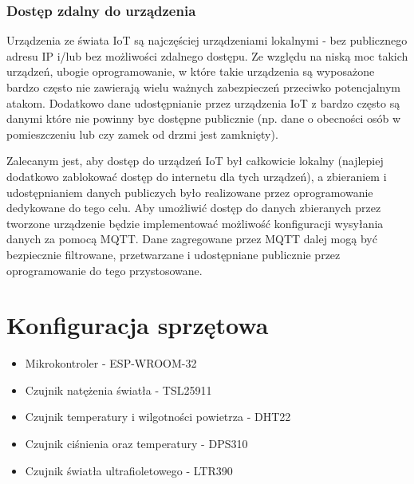 \documentclass[12pt,a4paper]{article}
\begin{document}
\subsubsection{Dostęp zdalny do urządzenia}

Urządzenia ze świata IoT są najczęściej urządzeniami lokalnymi - bez publicznego adresu IP i/lub bez możliwości zdalnego dostępu.
Ze względu na niską moc takich urządzeń, ubogie oprogramowanie, w które takie urządzenia są wyposażone bardzo często nie zawierają
wielu ważnych zabezpieczeń przeciwko potencjalnym atakom. Dodatkowo dane udostępnianie przez urządzenia IoT z bardzo często są danymi które nie powinny byc dostępne publicznie
(np. dane o obecności osób w pomieszczeniu lub czy zamek od drzmi jest zamknięty). 

Zalecanym jest, aby dostęp do urządzeń IoT był całkowicie lokalny (najlepiej dodatkowo zablokować dostęp do internetu dla tych urządzeń),
a zbieraniem i udostępnianiem danych publiczych było realizowane przez oprogramowanie dedykowane do tego celu.
Aby umożliwić dostęp do danych zbieranych przez tworzone urządzenie będzie implementować możliwość konfiguracji wysyłania danych za pomocą MQTT.
Dane zagregowane przez MQTT dalej mogą być bezpiecznie filtrowane, przetwarzane i udostępniane publicznie przez oprogramowanie do tego przystosowane.

\section{Konfiguracja sprzętowa}

\begin{itemize}
    \item Mikrokontroler - ESP-WROOM-32
    \item Czujnik natężenia światła - TSL25911
    \item Czujnik temperatury i wilgotności powietrza - DHT22
    \item Czujnik ciśnienia oraz temperatury - DPS310
    \item Czujnik światła ultrafioletowego - LTR390
\end{itemize}
\end{document}
